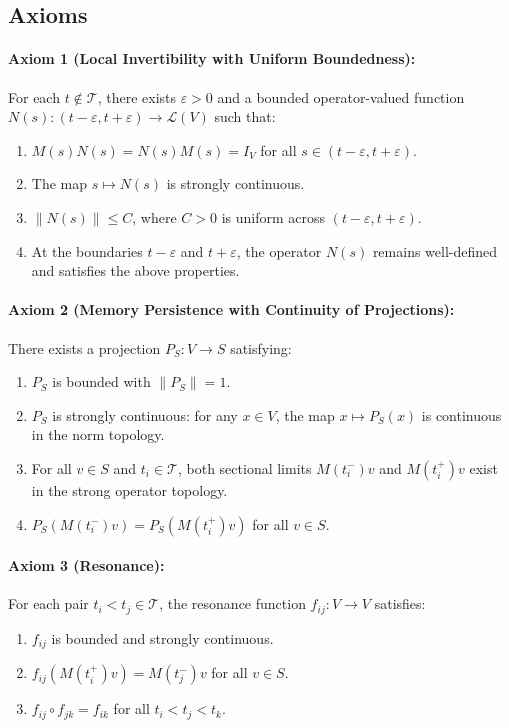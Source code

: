 \documentclass[12pt]{article}
\theoremstyle{definition}
\theoremstyle{plain}
\begin{document}
\subsection{Axioms}

\paragraph{Axiom 1 (Local Invertibility with Uniform Boundedness):}
For each \( t \notin \mathcal{T} \), there exists \( \varepsilon > 0 \) and a bounded operator-valued function \( N(s): (t-\varepsilon, t+\varepsilon) \to \mathcal{L}(V) \) such that:
\begin{enumerate}
    \item \( M(s)N(s) = N(s)M(s) = I_V \) for all \( s \in (t-\varepsilon, t+\varepsilon) \).
    \item The map \( s \mapsto N(s) \) is strongly continuous.
    \item \( \|N(s)\| \leq C \), where \( C > 0 \) is uniform across \( (t-\varepsilon, t+\varepsilon) \).
    \item At the boundaries \( t-\varepsilon \) and \( t+\varepsilon \), the operator \( N(s) \) remains well-defined and satisfies the above properties.
\end{enumerate}

\paragraph{Axiom 2 (Memory Persistence with Continuity of Projections):}
There exists a projection \( P_S: V \to S \) satisfying:
\begin{enumerate}
    \item \( P_S \) is bounded with \( \|P_S\| = 1 \).
    \item \( P_S \) is strongly continuous: for any \( x \in V \), the map \( x \mapsto P_S(x) \) is continuous in the norm topology.
    \item For all \( v \in S \) and \( t_i \in \mathcal{T} \), both sectional limits \( M(t_i^-)v \) and \( M(t_i^+)v \) exist in the strong operator topology.
    \item \( P_S(M(t_i^-)v) = P_S(M(t_i^+)v) \) for all \( v \in S \).
\end{enumerate}

\paragraph{Axiom 3 (Resonance):}
For each pair \( t_i < t_j \in \mathcal{T} \), the resonance function \( f_{ij}: V \to V \) satisfies:
\begin{enumerate}
    \item \( f_{ij} \) is bounded and strongly continuous.
    \item \( f_{ij}(M(t_i^+)v) = M(t_j^-)v \) for all \( v \in S \).
    \item \( f_{ij} \circ f_{jk} = f_{ik} \) for all \( t_i < t_j < t_k \).
\end{enumerate}
\end{document}
